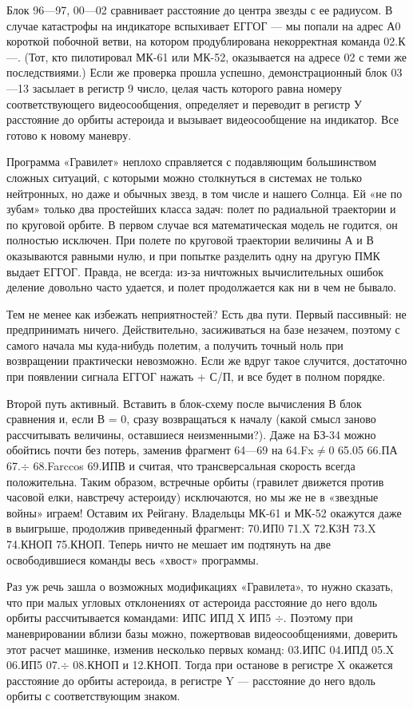 \documentclass[11pt,a4paper,oneside]{article}
\begin{document}
Блок 96—97, 00—02 сравнивает расстояние до центра звезды с ее радиусом. В случае катастрофы на индикаторе вспыхивает ЕГГОГ — мы попали на адрес А0 короткой побочной ветви, на котором продублирована некорректная команда 02.К—. (Тот, кто пилотировал МК-61 или МК-52, оказывается на адресе 02 с теми же последствиями.) Если же проверка прошла успешно, демонстрационный блок 03—13 засылает в регистр 9 число, целая часть которого равна номеру соответствующего видеосообщения, определяет и переводит в регистр У расстояние до орбиты астероида и вызывает видеосообщение на индикатор. Все готово к новому маневру.

Программа «Гравилет» неплохо справляется с подавляющим большинством сложных ситуаций, с которыми можно столкнуться в системах не только нейтронных, но даже и обычных звезд, в том числе и нашего Солнца. Ей «не по зубам» только два простейших класса задач: полет по радиальной траектории и по круговой орбите. В первом случае вся математическая модель не годится, он полностью исключен. При полете по круговой траектории величины А и В оказываются равными нулю, и при попытке разделить одну на другую ПМК выдает ЕГГОГ. Правда, не всегда: из-за ничтожных вычислительных ошибок деление довольно часто удается, и полет продолжается как ни в чем не бывало.

Тем не менее как избежать неприятностей? Есть два пути. Первый пассивный: не предпринимать ничего. Действительно, засиживаться на базе незачем, поэтому с самого начала мы куда-нибудь полетим, а получить точный ноль при возвращении практически невозможно. Если же вдруг такое случится, достаточно при появлении сигнала ЕГГОГ нажать + С/П, и все будет в полном порядке.

Второй путь активный. Вставить в блок-схему после вычисления В блок сравнения и, если В = 0, сразу возвращаться к началу (какой смысл заново рассчитывать величины, оставшиеся неизменными?). Даже на БЗ-34 можно обойтись почти без потерь, заменив фрагмент 64—69 на 64.Fx$\neq$0 65.05 66.ПА 67.$\div$ 68.Farccos 69.ИПВ и считая, что трансверсальная скорость всегда положительна. Таким образом, встречные орбиты (гравилет движется против часовой елки, навстречу астероиду) исключаются, но мы же не в «звездные войны» играем! Оставим их Рейгану. Владельцы МК-61 и МК-52 окажутся даже в выигрыше, продолжив приведенный фрагмент: 70.ИП0 71.X 72.К3Н 73.X 74.КНОП 75.КНОП. Теперь ничто не мешает им подтянуть на две освободившиеся команды весь «хвост» программы.

Раз уж речь зашла о возможных модификациях «Гравилета», то нужно сказать, что при малых угловых отклонениях от астероида расстояние до него вдоль орбиты рассчитывается командами: ИПС ИПД X ИП5 $\div$. Поэтому при маневрировании вблизи базы можно, пожертвовав видеосообщениями, доверить этот расчет машинке, изменив несколько первых команд: 03.ИПС 04.ИПД 05.X 06.ИП5 07.$\div$ 08.КНОП и 12.КНОП. Тогда при останове в регистре X окажется расстояние до орбиты астероида, в регистре Y — расстояние до него вдоль орбиты с соответствующим знаком.
\end{document}
